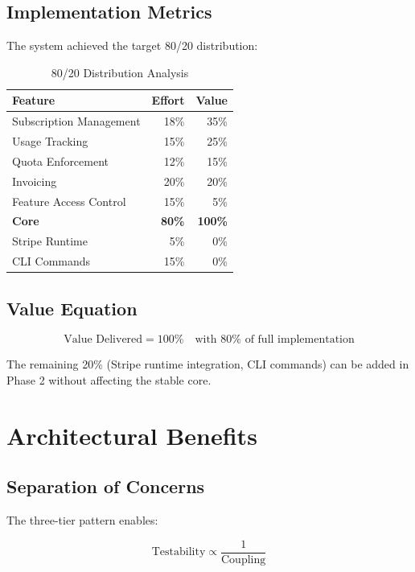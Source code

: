 \documentclass[12pt]{report}
\begin{document}
\subsection{Implementation Metrics}

The system achieved the target 80/20 distribution:

\begin{table}[h]
\centering
\begin{tabular}{lrr}
\toprule
\textbf{Feature} & \textbf{Effort} & \textbf{Value} \\
\midrule
Subscription Management & 18\% & 35\% \\
Usage Tracking & 15\% & 25\% \\
Quota Enforcement & 12\% & 15\% \\
Invoicing & 20\% & 20\% \\
Feature Access Control & 15\% & 5\% \\
\midrule
\textbf{Core} & \textbf{80\%} & \textbf{100\%} \\
Stripe Runtime & 5\% & 0\% \\
CLI Commands & 15\% & 0\% \\
\bottomrule
\end{tabular}
\caption{80/20 Distribution Analysis}
\end{table}

\subsection{Value Equation}

\begin{equation}
\text{Value Delivered} = 100\% \quad \text{with } 80\% \text{ of full implementation}
\end{equation}

The remaining 20\% (Stripe runtime integration, CLI commands) can be added in Phase 2 without affecting the stable core.

\section{Architectural Benefits}

\subsection{Separation of Concerns}

The three-tier pattern enables:

\begin{equation}
\text{Testability} \propto \frac{1}{\text{Coupling}}
\end{equation}
\end{document}
